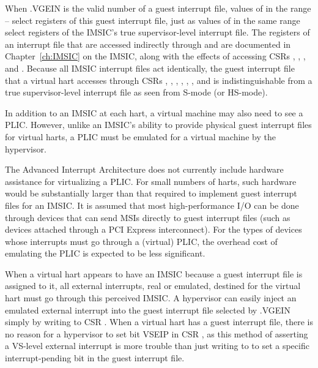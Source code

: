 When .VGEIN is the valid number of a guest interrupt
file, values of  in the range -- select
registers of this guest interrupt file, just as values of 
in the same range select registers of the IMSIC's true supervisor-level
interrupt file.
The registers of an interrupt file that are accessed indirectly through
 and  are documented in Chapter~\ref{ch:IMSIC}
on the IMSIC, along with the effects of accessing CSRs ,
, , and .
Because all IMSIC interrupt files act identically, the guest interrupt
file that a virtual hart accesses through CSRs , ,
, , , ,
and  is indistinguishable from a true supervisor-level
interrupt file as seen from \mbox{S-mode} (or \mbox{HS-mode}).

In addition to an IMSIC at each hart, a virtual machine may also need
to see a PLIC.
However, unlike an IMSIC's ability to provide physical guest interrupt
files for virtual harts, a PLIC must be emulated for a virtual machine
by the hypervisor.

\begin{commentary}
The Advanced Interrupt Architecture does not currently include hardware
assistance for virtualizing a PLIC.
For small numbers of harts, such hardware would be substantially larger
than that required to implement guest interrupt files for an IMSIC.
It is assumed that most high-performance I/O can be done through
devices that can send MSIs directly to guest interrupt files (such as
devices attached through a PCI Express interconnect).
For the types of devices whose interrupts must go through a (virtual)
PLIC, the overhead cost of emulating the PLIC is expected to be less
significant.
\end{commentary}

When a virtual hart appears to have an IMSIC because a guest interrupt
file is assigned to it, all external interrupts, real or emulated,
destined for the virtual hart must go through this perceived IMSIC.
A hypervisor can easily inject an emulated external interrupt into the
guest interrupt file selected by .VGEIN simply by writing to
CSR .
When a virtual hart has a guest interrupt file, there is no reason
for a hypervisor to set bit VSEIP in CSR , as this method
of asserting a VS-level external interrupt is more trouble than just
writing to  to set a specific interrupt-pending bit in
the guest interrupt file.

